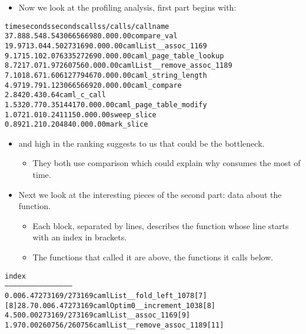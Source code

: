 \documentclass{beamer}
\newcommand{\tmverbatim}[1]{\text{{\ttfamily{#1}}}}
\newenvironment{tmcode}[1][]{\begin{alltt} }{\end{alltt}}
\begin{document}
{}{\hlendline{}}
\begin{itemize}
  \item Now we look at the profiling analysis, first part begins with:
\end{itemize}
{\small{\begin{tmcode}
 time   seconds   seconds    calls   s/call   s/call  name    
 37.88      8.54     8.54 306656698    0.00     0.00  compare_val
 19.97     13.04     4.50   273169     0.00     0.00  camlList__assoc_1169
  9.17     15.10     2.07 633527269    0.00     0.00  caml_page_table_lookup
  8.72     17.07     1.97   260756    0.00  0.00 camlList__remove_assoc_1189
  7.10     18.67     1.60 612779467    0.00     0.00  caml_string_length
  4.97     19.79     1.12 306656692     0.00    0.00  caml_compare
  2.84     20.43     0.64                             caml_c_call
  1.53     20.77     0.35    14417     0.00     0.00  caml_page_table_modify
  1.07     21.01     0.24     1115     0.00     0.00  sweep_slice
  0.89     21.21     0.20      484     0.00     0.00  mark_slice
\end{tmcode}}}
\begin{itemize}
  \item {}{}{} and
  {}{}{} high in the
  ranking suggests to us that \tmverbatim{increment} could be the bottleneck.
  \begin{itemize}
    \item They both use comparison which could explain why
    \tmverbatim{compare\_val} consumes the most of time.
  \end{itemize}
  \item Next we look at the interesting pieces of the second part: data about
  the \tmverbatim{increment} function.
  \begin{itemize}
    \item Each block, separated by \tmverbatim{------} lines, describes the
    function whose line starts with an index in brackets.
    
    \item The functions that called it are above, the functions it calls
    below.
  \end{itemize}
\end{itemize}
{\small{\begin{tmcode}
index %
-----------------------------------------------
                0.00    6.47  273169/273169  camlList__fold_left_1078 [7]
[8]     28.7    0.00    6.47  273169         camlOptim0__increment_1038 [8]
                4.50    0.00  273169/273169  camlList__assoc_1169 [9]
               1.97    0.00  260756/260756  camlList__remove_assoc_1189 [11]
\end{tmcode}}}
\end{document}
